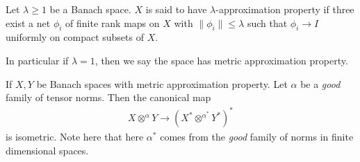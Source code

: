 

\begin{definition}
  Let $\lambda \ge 1$ be a Banach space. $X$ is said to have
  $\lambda$-approximation property if three exist a net $\phi_i$ of
  finite rank maps on $X$ with $ \|\phi_i\| \le \lambda$ such that
  $\phi_i \to I$ uniformly on compact subsets of $X$.

  In particular if $\lambda = 1$, then we say the space has metric
  approximation property.
\end{definition}

\begin{theorem}
  If $X, Y$ be Banach spaces with metric approximation property. Let
  $\alpha$ be a \textit{good} family of tensor norms. Then the canonical map
  \begin{align*}
    X \otimes^\alpha Y \to (X^* \otimes^{\alpha^*} Y^*)^*
  \end{align*}
  is isometric.
  Note here that here $\alpha^*$ comes from the \textit{good} family
  of norms in finite dimensional spaces.
\end{theorem}
